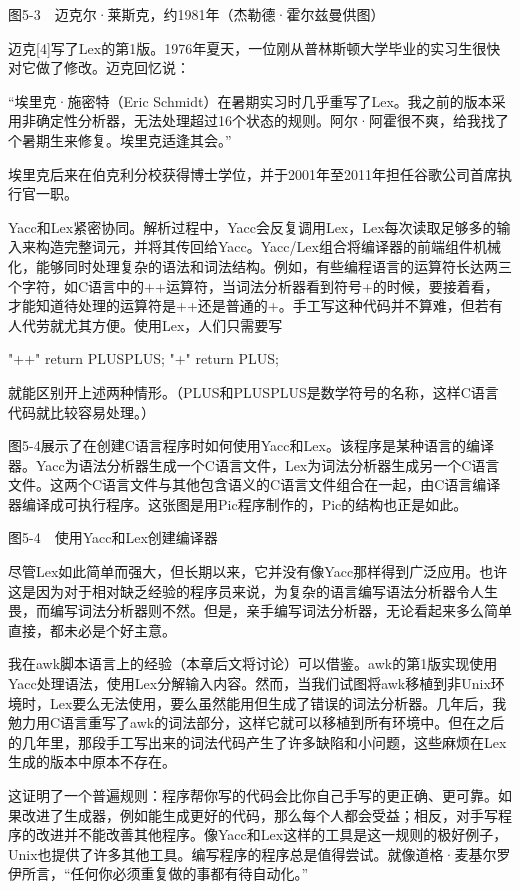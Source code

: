 \documentclass[a4paper,12pt,UTF8,twoside]{ctexbook}
\begin{document}
{{图5-3　迈克尔·莱斯克，约1981年（杰勒德·霍尔兹曼供图）

迈克[4]写了Lex的第1版。1976年夏天，一位刚从普林斯顿大学毕业的实习生很快对它做了修改。迈克回忆说：

“埃里克·施密特（Eric Schmidt）在暑期实习时几乎重写了Lex。我之前的版本采用非确定性分析器，无法处理超过16个状态的规则。阿尔·阿霍很不爽，给我找了个暑期生来修复。埃里克适逢其会。”



埃里克后来在伯克利分校获得博士学位，并于2001年至2011年担任谷歌公司首席执行官一职。

Yacc和Lex紧密协同。解析过程中，Yacc会反复调用Lex，Lex每次读取足够多的输入来构造完整词元，并将其传回给Yacc。Yacc/Lex组合将编译器的前端组件机械化，能够同时处理复杂的语法和词法结构。例如，有些编程语言的运算符长达两三个字符，如C语言中的++运算符，当词法分析器看到符号+的时候，要接着看，才能知道待处理的运算符是++还是普通的+。手工写这种代码并不算难，但若有人代劳就尤其方便。使用Lex，人们只需要写

"++" { return PLUSPLUS; } "+" { return PLUS; }

就能区别开上述两种情形。（PLUS和PLUSPLUS是数学符号的名称，这样C语言代码就比较容易处理。）

图5-4展示了在创建C语言程序时如何使用Yacc和Lex。该程序是某种语言的编译器。Yacc为语法分析器生成一个C语言文件，Lex为词法分析器生成另一个C语言文件。这两个C语言文件与其他包含语义的C语言文件组合在一起，由C语言编译器编译成可执行程序。这张图是用Pic程序制作的，Pic的结构也正是如此。



图5-4　使用Yacc和Lex创建编译器

尽管Lex如此简单而强大，但长期以来，它并没有像Yacc那样得到广泛应用。也许这是因为对于相对缺乏经验的程序员来说，为复杂的语言编写语法分析器令人生畏，而编写词法分析器则不然。但是，亲手编写词法分析器，无论看起来多么简单直接，都未必是个好主意。

我在awk脚本语言上的经验（本章后文将讨论）可以借鉴。awk的第1版实现使用Yacc处理语法，使用Lex分解输入内容。然而，当我们试图将awk移植到非Unix环境时，Lex要么无法使用，要么虽然能用但生成了错误的词法分析器。几年后，我勉力用C语言重写了awk的词法部分，这样它就可以移植到所有环境中。但在之后的几年里，那段手工写出来的词法代码产生了许多缺陷和小问题，这些麻烦在Lex生成的版本中原本不存在。

这证明了一个普遍规则：程序帮你写的代码会比你自己手写的更正确、更可靠。如果改进了生成器，例如能生成更好的代码，那么每个人都会受益；相反，对手写程序的改进并不能改善其他程序。像Yacc和Lex这样的工具是这一规则的极好例子，Unix也提供了许多其他工具。编写程序的程序总是值得尝试。就像道格·麦基尔罗伊所言，“任何你必须重复做的事都有待自动化。”





}}
\end{document}
